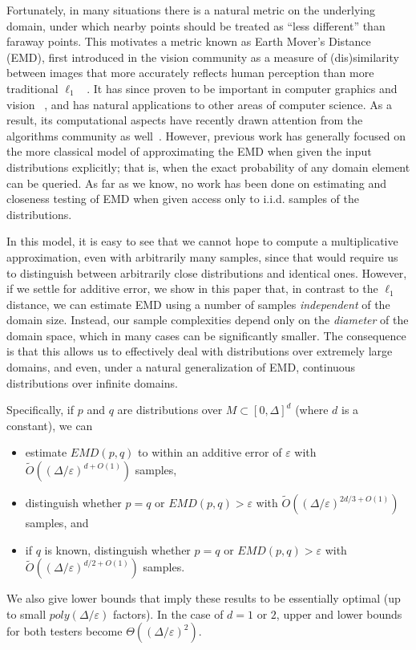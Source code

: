 \documentclass[11pt]{article}
\newcommand{\eps}{\varepsilon}
\begin{document}
Fortunately, in many situations there is a natural metric on the underlying domain,
under which nearby points should be treated as ``less different'' than faraway
points. This motivates a metric known as Earth Mover's Distance (EMD), first
introduced in the vision community as a measure of (dis)similarity between images
that more accurately reflects human perception than more traditional $\ell_1$
~\cite{peleg}. It has since proven to be important in computer graphics and vision
~\cite{rubner2,rubner1,rubner3,cohen,ruzon1,ruzon2,rubner4}, and
has natural applications to other areas of computer science. As a result, its
computational aspects have recently drawn attention from the algorithms community
as well~\cite{alex,indyk,charikar,indyk2}. However, previous work has generally focused
on the more classical model of approximating the EMD when given the input distributions
explicitly; that is, when the exact probability of any domain element can be queried.
As far as we know, no work has been done on estimating and closeness
testing of EMD when given access only to i.i.d. samples of the distributions.

In this model, it is easy to see that we cannot hope to compute a multiplicative approximation,
even with arbitrarily many samples, since that would require us to distinguish between
arbitrarily close distributions and identical ones. However, if we settle for additive error, we
show in this paper that, in contrast to the $\ell_1$ distance, we can estimate EMD using a number
of samples {\em independent}
of the domain size. Instead, our sample complexities depend only on the {\em
diameter} of the domain space, which in many cases can be significantly smaller.
The consequence is that this allows us to effectively deal with distributions over
extremely large domains, and even, under a natural generalization of EMD,
continuous distributions over infinite domains.

Specifically, if $p$ and $q$ are distributions over $M \subset [0,\Delta]^d$ (where $d$ is a
constant), we can
\begin{itemize}
	\item estimate $EMD(p,q)$ to within an additive error of $\eps$ with
		$\tilde{O}((\Delta/\eps)^{d + O(1)})$ samples,
	\item distinguish whether $p=q$ or $EMD(p,q) > \eps$ with
		$\tilde{O}((\Delta/\eps)^{2d/3 + O(1)})$ samples, and
	\item if $q$ is known, distinguish whether $p=q$ or $EMD(p,q) > \eps$ with
		$\tilde{O}((\Delta/\eps)^{d/2 + O(1)})$ samples.
\end{itemize}
We also give lower bounds that imply these results to be essentially optimal
(up to small $poly(\Delta/\eps)$ factors). In the case of $d=1$ or $2$, upper
and lower bounds for both testers become $\Theta((\Delta/\eps)^2)$.
\end{document}
